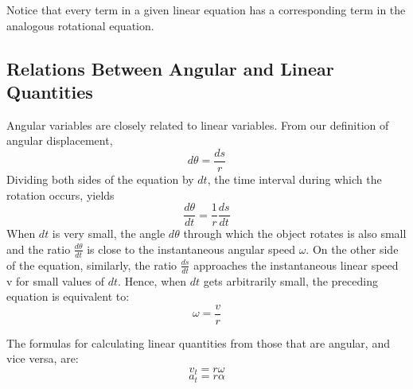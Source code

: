 Notice that every term in a given linear equation has a corresponding term in the
analogous rotational equation.

\subsection{Relations Between Angular and Linear Quantities}
Angular variables are closely related to linear variables. From our definition of angular displacement, 
$$d \theta = \frac{d s}{r}$$
Dividing both sides of the equation by $d t$, the time interval during which the rotation occurs, yields
$$\frac{d \theta}{d t} = \frac{1}{r} \frac{d s}{d t}$$
When $d t$ is very small, the angle $d \theta$ through which the object rotates is also small
and the ratio $\frac{d \theta}{d t}$ is close to the instantaneous angular speed $\omega$. On the other
side of the equation, similarly, the ratio $\frac{d s}{d t}$ approaches the instantaneous linear speed v for small values of $d t$. Hence, when $d t$ gets arbitrarily small, the preceding equation is equivalent to:
$$\omega = \frac{v}{r}$$
\begin{form}
The formulas for calculating linear quantities from those that are angular, and vice versa, are:
$$v_t = r \omega$$
$$a_t = r \alpha$$
\end{form}
